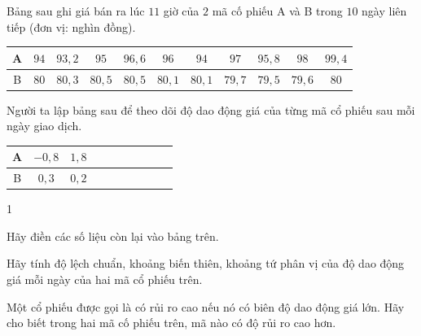 \begin{bt}%
	Bảng sau ghi giá bán ra lúc $11$ giờ của $2$ mã cố phiếu A và B trong $10$ ngày liên tiếp (đơn vị: nghìn đồng).
	\begin{center}
		\begin{tabular}{|c|c|c|c|c|c|c|c|c|c|c|}
			\hline A & $94$ & $93{,}2$ & $95$ & $96{,}6$ & $96$ & $94$ & $97$ & $95{,}8$ & $98$ & $99{,}4$ \\
			\hline B & $80$ & $80{,}3 $& $80{,}5$ & $80{,}5$ & $80{,}1$ & $80{,}1 $& $79{,}7$ & $79{,}5$ & $79{,}6 $& $80$ \\
			\hline
		\end{tabular}
	\end{center}
	Người ta lập bảng sau để theo dõi độ dao động giá của từng mã cổ phiếu sau mỗi ngày giao dịch.
	\begin{center}
		\begin{tabular}{|c|c|c|c|c|c|c|c|c|c|}
			\hline A & $-0{,}8$ & $1{,}8 $& & & & & & & \\
			\hline B & $0{,}3$ & $0{,}2$ & & & & & & & \\
			\hline
		\end{tabular}
	\end{center}
	\begin{enumEX}[a)]{1}
		\item Hãy điền các số liệu còn lại vào bảng trên.
		\item Hãy tính độ lệch chuẩn, khoảng biến thiên, khoảng tứ phân vị của độ dao động giá mỗi ngày của hai mã cổ phiếu trên.
		\item Một cổ phiếu được gọi là có rủi ro cao nếu nó có biên độ dao động giá lớn. Hãy cho biết trong hai mã cố phiếu trên, mã nào có độ rủi ro cao hơn.
	\end{enumEX}
\end{bt}

